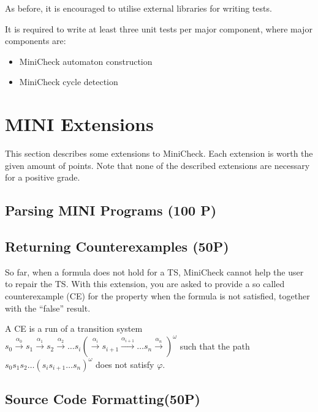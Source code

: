 \documentclass{article}
\begin{document}
As before, it is encouraged to utilise external libraries for writing tests.

It is required to write at least three unit tests per major component, where major components are:

\begin{itemize}
\item MiniCheck automaton construction
\item MiniCheck cycle detection
\end{itemize}


\section{MINI Extensions}
This section describes some extensions to MiniCheck. Each extension is worth the given amount of points. 
Note that none of the described extensions are necessary for a positive grade.

\subsection{Parsing MINI Programs (100 P)}

\subsection{Returning Counterexamples (50P)}
So far, when a formula does not hold for a TS, MiniCheck cannot help the user to repair the TS. With 
this extension, you are asked to provide a so called counterexample (CE) for the property when the formula is not 
satisfied, together with the ``false'' result.

A CE is a run of a transition system $s_0 \xrightarrow[]{\alpha_0} s_1 \xrightarrow[]{\alpha_1} s_2 \xrightarrow[]{\alpha_2} \dots s_i (\xrightarrow[]{\alpha_i} s_{i+1} \xrightarrow[]{\alpha_{i+1}} \dots s_n \xrightarrow[]{\alpha_n})^{\omega}$ such 
that the path $s_0s_1s_2 \dots (s_is_{i+1} \dots s_n )^{\omega}$ does not satisfy $\varphi$.

\subsection{Source Code Formatting(50P)}
\end{document}
